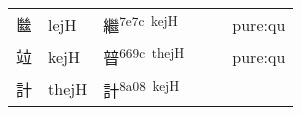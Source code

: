 \documentclass[14pt,a4paper]{scrartcl}
\begin{document}
\begin{longtable}[c]{@{}llllll@{}}
\begin{minipage}[t]{0.14\columnwidth}\raggedright\strut
㡭
\strut\end{minipage} &
\begin{minipage}[t]{0.14\columnwidth}\raggedright\strut
lejH
\strut\end{minipage} &
\begin{minipage}[t]{0.14\columnwidth}\raggedright\strut
繼\textsuperscript{7e7c~kejH}
\strut\end{minipage} &
\begin{minipage}[t]{0.14\columnwidth}\raggedright\strut
\strut\end{minipage} &
\begin{minipage}[t]{0.14\columnwidth}\raggedright\strut
\strut\end{minipage} &
\begin{minipage}[t]{0.14\columnwidth}\raggedright\strut
pure:qu
\strut\end{minipage}\tabularnewline
\begin{minipage}[t]{0.14\columnwidth}\raggedright\strut
竝
\strut\end{minipage} &
\begin{minipage}[t]{0.14\columnwidth}\raggedright\strut
kejH
\strut\end{minipage} &
\begin{minipage}[t]{0.14\columnwidth}\raggedright\strut
暜\textsuperscript{669c~thejH}
\strut\end{minipage} &
\begin{minipage}[t]{0.14\columnwidth}\raggedright\strut
\strut\end{minipage} &
\begin{minipage}[t]{0.14\columnwidth}\raggedright\strut
\strut\end{minipage} &
\begin{minipage}[t]{0.14\columnwidth}\raggedright\strut
pure:qu
\strut\end{minipage}\tabularnewline
\begin{minipage}[t]{0.14\columnwidth}\raggedright\strut
計
\strut\end{minipage} &
\begin{minipage}[t]{0.14\columnwidth}\raggedright\strut
thejH
\strut\end{minipage} &
\begin{minipage}[t]{0.14\columnwidth}\raggedright\strut
計\textsuperscript{8a08~kejH}
\strut\end{minipage} &
\begin{minipage}[t]{0.14\columnwidth}\raggedright\strut

\end{minipage}
\end{longtable}
\end{document}
